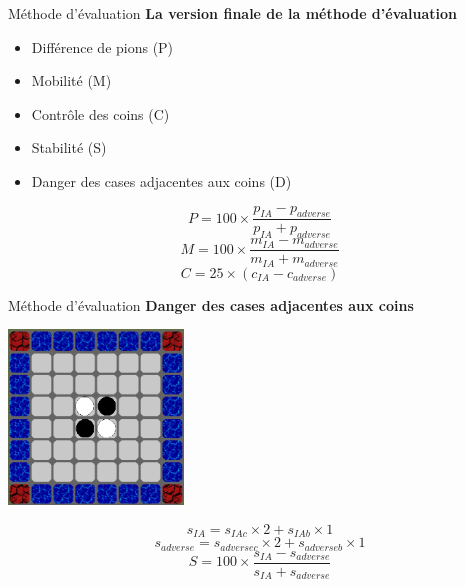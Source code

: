 \begin{frame}[t]{Méthode d'évaluation}
    \textbf{La version finale de la méthode d'évaluation}
    \begin{itemize}
        \item Différence de pions (P)
        \item Mobilité (M)
        \item Contrôle des coins (C)
        \item Stabilité (S)
        \item Danger des cases adjacentes aux coins (D)
    \end{itemize}
    \vspace{1.5em}
    \[
        P = 100 \times \frac{p_{IA} - p_{adverse}}{p_{IA} + p_{adverse}}
    \]
    \vspace{0.8em}
    \[
        M = 100 \times \frac{m_{IA} - m_{adverse}}{m_{IA} + m_{adverse}}
    \]
    \vspace{0.6em}
    \[
        C = 25 \times {(c_{IA} - c_{adverse})}
    \]
\end{frame}

\begin{frame}[t]{Méthode d'évaluation}
    \textbf{Danger des cases adjacentes aux coins}
    \hspace{0.2\textwidth}
    \begin{center}
        \includegraphics[width=0.35\textwidth]{img/stabilite.png}
    \end{center}
    \[
        s_{IA} = s_{IAc} \times 2 + s_{IAb} \times 1
    \]
    \[
        s_{adverse} = s_{adversec} \times 2 + s_{adverseb} \times 1
    \]
    \[
        S = 100 \times \frac{s_{IA} - s_{adverse}}{s_{IA} + s_{adverse}}
    \]
\end{frame}

